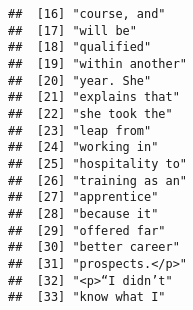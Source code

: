 \documentclass[]{article}
\begin{document}
\begin{verbatim}
##  [16] "course, and"                                                                                                                              
##  [17] "will be"                                                                                                                                  
##  [18] "qualified"                                                                                                                                
##  [19] "within another"                                                                                                                           
##  [20] "year. She"                                                                                                                                
##  [21] "explains that"                                                                                                                            
##  [22] "she took the"                                                                                                                             
##  [23] "leap from"                                                                                                                                
##  [24] "working in"                                                                                                                               
##  [25] "hospitality to"                                                                                                                           
##  [26] "training as an"                                                                                                                           
##  [27] "apprentice"                                                                                                                               
##  [28] "because it"                                                                                                                               
##  [29] "offered far"                                                                                                                              
##  [30] "better career"                                                                                                                            
##  [31] "prospects.</p>"                                                                                                                           
##  [32] "<p>“I didn’t"                                                                                                                             
##  [33] "know what I"                                                                                                                              

\end{verbatim}
\end{document}
